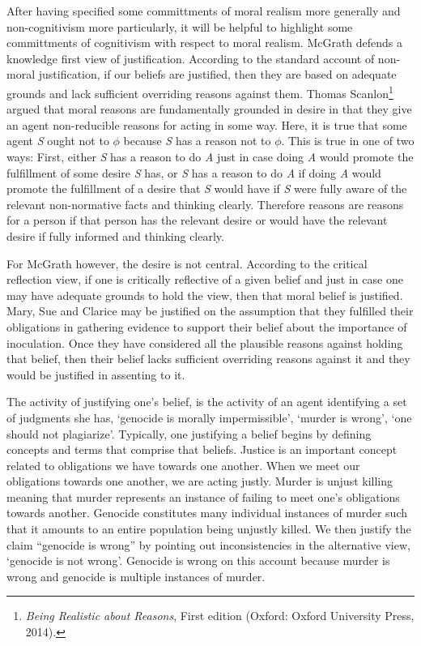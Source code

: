 \documentclass[phdthesis,12pt,final]{wuthesis}
\theoremstyle{definition}
\theoremstyle{definition}
\theoremstyle{definition}
\theoremstyle{definition}
\theoremstyle{remark}
\begin{document}
After having specified some committments of moral realism more generally and non-cognitivism more particularly, it will be helpful to highlight some committments of cognitivism with respect to moral realism. McGrath defends a knowledge first view of justification. According to the standard account of non-moral justification, if our beliefs are justified, then they are based on adequate grounds and lack sufficient overriding reasons against them. Thomas Scanlon\footnote{\emph{Being Realistic about Reasons}, First edition (Oxford: Oxford University Press, 2014).} argued that moral reasons are fundamentally grounded in desire in that they give an agent non-reducible reasons for acting in some way. Here, it is true that some agent \emph{S} ought not to \(\phi\) because \emph{S} has a reason not to \(\phi\). This is true in one of two ways: First, either \emph{S} has a reason to do \emph{A} just in case doing \emph{A} would promote the fulfillment of some desire \emph{S} has, or \emph{S} has a reason to do \emph{A} if doing \emph{A} would promote the fulfillment of a desire that \emph{S} would have if \emph{S} were fully aware of the relevant non-normative facts and thinking clearly. Therefore reasons are reasons for a person if that person has the relevant desire or would have the relevant desire if fully informed and thinking clearly.

For McGrath however, the desire is not central. According to the critical reflection view, if one is critically reflective of a given belief and just in case one may have adequate grounds to hold the view, then that moral belief is justified. Mary, Sue and Clarice may be justified on the assumption that they fulfilled their obligations in gathering evidence to support their belief about the importance of inoculation. Once they have considered all the plausible reasons against holding that belief, then their belief lacks sufficient overriding reasons against it and they would be justified in assenting to it.

The activity of justifying one's belief, is the activity of an agent identifying a set of judgments she has, `genocide is morally impermissible', `murder is wrong', `one should not plagiarize'. Typically, one justifying a belief begins by defining concepts and terms that comprise that beliefs. Justice is an important concept related to obligations we have towards one another. When we meet our obligations towards one another, we are acting justly. Murder is unjust killing meaning that murder represents an instance of failing to meet one's obligations towards another. Genocide constitutes many individual instances of murder such that it amounts to an entire population being unjustly killed. We then justify the claim ``genocide is wrong'' by pointing out inconsistencies in the alternative view, `genocide is not wrong'. Genocide is wrong on this account because murder is wrong and genocide is multiple instances of murder.
\end{document}
